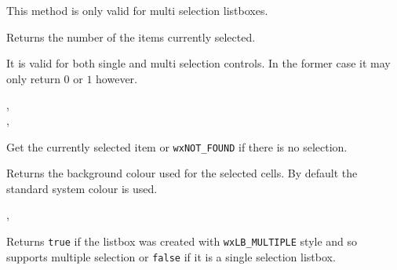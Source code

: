 This method is only valid for multi selection listboxes.




\label{wxvlistboxgetselectedcount}


Returns the number of the items currently selected.

It is valid for both single and multi selection controls. In the former case it
may only return $0$ or $1$ however.


,\\
,\\


\label{wxvlistboxgetselection}


Get the currently selected item or {\tt wxNOT\_FOUND} if there is no selection.


\label{wxvlistboxgetselectionbackground}


Returns the background colour used for the selected cells. By default the
standard system colour is used.


,\\


\label{wxvlistboxishasmultipleselection}


Returns {\tt true} if the listbox was created with {\tt wxLB\_MULTIPLE} style
and so supports multiple selection or {\tt false} if it is a single selection
listbox.


\label{wxvlistboxiscurrent}



